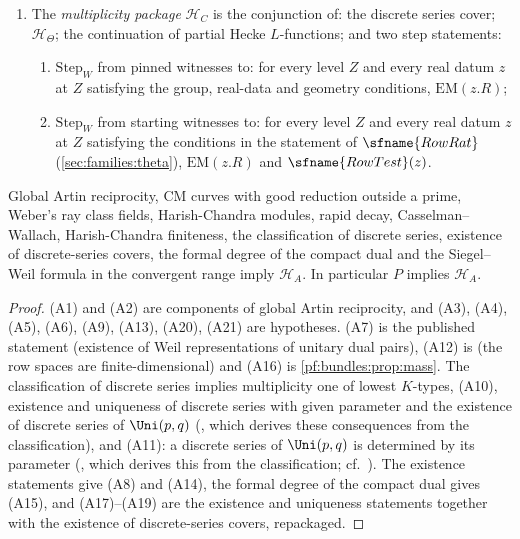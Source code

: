 \begin{definition}[Packages]
\begin{enumerate}[label=(\alph*)]
\cref{pf:bundles:lem:dm}, the unramified doubling computation for $\GL_n$, Bernstein--Zelevinsky finiteness, Green's cuspidal
characters, Weil representations of unitary pairs and Schur orthogonality for square-integrable representations.
\item The \emph{multiplicity package} $\mathcal H_C$ is the conjunction of: the discrete series cover; $\mathcal H_\Theta$; the
continuation of partial Hecke $L$-functions; and two step statements:
\begin{enumerate}[label=(C\arabic*)]
\item $\mathrm{Step}_W$ from pinned witnesses to: for every level $Z$ and every real datum $z$ at $Z$ satisfying the group,
real-data and geometry conditions, $\mathrm{EM}(z.R)$;
\item $\mathrm{Step}_W$ from starting witnesses to: for every level $Z$ and every real datum $z$ at $Z$ satisfying the conditions
in the statement of $\sfname{RowRat}$ (\cref{sec:families:theta}), $\mathrm{EM}(z.R)$ and $\sfname{RowTest}(z)$.
\end{enumerate}
\end{enumerate}
\end{definition}

\begin{lemma}\label{pf:bundles:lem:hypA}
Global Artin reciprocity, CM curves with good reduction outside a prime, Weber's ray class fields, Harish-Chandra modules, rapid
decay, Casselman--Wallach, Harish-Chandra finiteness, the classification of discrete series, existence of discrete-series covers, the
formal degree of the compact dual and the Siegel--Weil formula in the convergent range imply $\mathcal H_A$. In particular $P$
implies $\mathcal H_A$.
\end{lemma}

\begin{proof}
(A1) and (A2) are components of global Artin reciprocity, and (A3), (A4), (A5), (A6), (A9), (A13), (A20), (A21) are hypotheses.
(A7) is the published statement  (existence of Weil representations of unitary
dual pairs), (A12) is  (the row spaces are finite-dimensional) and (A16) is
\cref{pf:bundles:prop:mass}. The classification of discrete series implies multiplicity one of lowest $K$-types, (A10), existence and
uniqueness of discrete series with given parameter and the existence of discrete series of $\Uni(p,q)$
(, which derives these consequences from the classification),
and (A11): a discrete series of $\Uni(p,q)$ is determined by its parameter (,
which derives this from the classification; cf.\ \cite{HarishChandra1966}). The existence statements give (A8) and (A14), the formal degree of the
compact dual gives (A15), and (A17)--(A19) are the existence and uniqueness statements together with the existence of discrete-series covers,
repackaged.
\end{proof}

